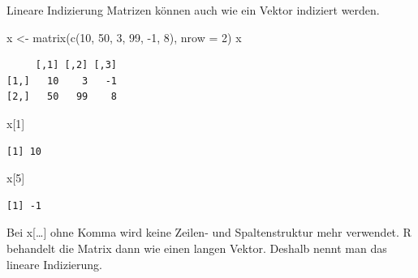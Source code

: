 \documentclass[
  10pt,
  ignorenonframetext,
  aspectratio=169,
]{beamer}
\newenvironment{Shaded}{}{}
\newcommand{\AttributeTok}[1]{\textcolor[rgb]{0.49,0.56,0.16}{#1}}
\newcommand{\DecValTok}[1]{\textcolor[rgb]{0.25,0.63,0.44}{#1}}
\newcommand{\FunctionTok}[1]{\textcolor[rgb]{0.02,0.16,0.49}{#1}}
\newcommand{\NormalTok}[1]{#1}
\newcommand{\OtherTok}[1]{\textcolor[rgb]{0.00,0.44,0.13}{#1}}
\newcommand{\SpecialCharTok}[1]{\textcolor[rgb]{0.25,0.44,0.63}{#1}}
\begin{document}
\begin{frame}[fragile]{Lineare Indizierung}
\label{lineare-indizierung}
Matrizen können auch wie ein Vektor indiziert werden.

\begin{Shaded}
\begin{Highlighting}[]
\NormalTok{x }\OtherTok{\textless{}{-}} \FunctionTok{matrix}\NormalTok{(}\FunctionTok{c}\NormalTok{(}\DecValTok{10}\NormalTok{, }\DecValTok{50}\NormalTok{, }\DecValTok{3}\NormalTok{, }\DecValTok{99}\NormalTok{, }\SpecialCharTok{{-}}\DecValTok{1}\NormalTok{, }\DecValTok{8}\NormalTok{), }\AttributeTok{nrow =} \DecValTok{2}\NormalTok{)}
\NormalTok{x}
\end{Highlighting}
\end{Shaded}

\begin{verbatim}
     [,1] [,2] [,3]
[1,]   10    3   -1
[2,]   50   99    8
\end{verbatim}

\begin{Shaded}
\begin{Highlighting}[]
\NormalTok{x[}\DecValTok{1}\NormalTok{]}
\end{Highlighting}
\end{Shaded}

\begin{verbatim}
[1] 10
\end{verbatim}

\begin{Shaded}
\begin{Highlighting}[]
\NormalTok{x[}\DecValTok{5}\NormalTok{]}
\end{Highlighting}
\end{Shaded}

\begin{verbatim}
[1] -1
\end{verbatim}

Bei x{[}\ldots{]} ohne Komma wird keine Zeilen- und Spaltenstruktur mehr
verwendet. R behandelt die Matrix dann wie einen langen Vektor. Deshalb
nennt man das lineare Indizierung.
\end{frame}
\end{document}

